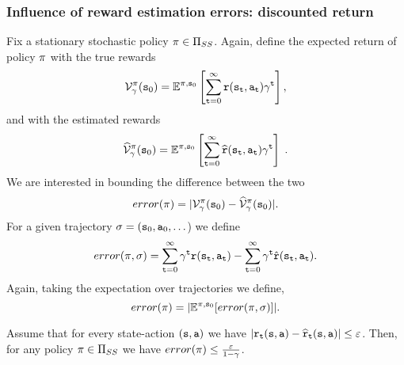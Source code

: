 \subsubsection{Influence of reward estimation errors: discounted return}

Fix a stationary stochastic policy $\pi\in {\Pi _{SS}}$.
Again, define the expected return of policy $\pi$ with the true
rewards
\[
\mathcal{V}^\pi_\gamma({\tt s}_0)=\mathbb{E}^{\pi,{\tt s}_0}\left[\sum_{{\tt t}=0}^\infty
{\tt r}({\tt s}_{\tt t},{\tt a}_{\tt t})\gamma^{\tt t}\right],
\]
and with the estimated rewards
\[
\widehat{\mathcal{V}}^\pi_\gamma({\tt s}_0)=\mathbb{E}^{\pi,{\tt s}_0}\left[\sum_{{\tt t}=0}^\infty
\widehat{{\tt r}}({\tt s}_{\tt t},{\tt a}_{\tt t})\gamma^{\tt t} \right]\;.
\]
We are interested in bounding the difference between the two
\[
error(\pi)=|\mathcal{V}^\pi_\gamma({\tt s}_0)-\widehat{\mathcal{V}}^\pi_\gamma({\tt s}_0)|.
\]
For a given trajectory
$\sigma=({\tt s}_0,{\tt a}_0,\ldots$)
we define
\[
error(\pi,\sigma)= \sum_{{\tt t}=0}^\infty \gamma^{\tt t}
{\tt r}({\tt s}_{\tt t},{\tt a}_{\tt t})- \sum_{{\tt t}=0}^\infty
\gamma^{\tt t} \hat{{\tt r}}({\tt s}_{\tt t},{\tt a}_{\tt t}).
\]
Again, taking the expectation over trajectories we define,
\[
error(\pi)=|\mathbb{E}^{\pi,{\tt s}_0} [error(\pi,\sigma)]|.
\]

\begin{lemma}
\label{lemma:approx-disc-error}
%
Assume that for every state-action $({\tt s},{\tt a})$ we have
$|{\tt r}_{\tt t}({\tt s},{\tt a})-\widehat{{\tt r}}_{\tt t}({\tt s},{\tt a})|\leq
\varepsilon$. Then, for any policy $\pi\in {\Pi _{SS}}$ we have
$error(\pi)\leq \frac{\varepsilon}{1-\gamma}$.
\end{lemma}

